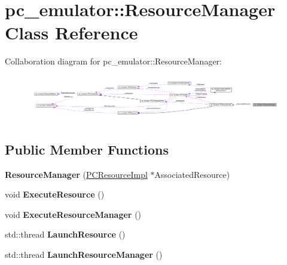 \hypertarget{classpc__emulator_1_1ResourceManager}{}\section{pc\+\_\+emulator\+:\+:Resource\+Manager Class Reference}
\label{classpc__emulator_1_1ResourceManager}


Collaboration diagram for pc\+\_\+emulator\+:\+:Resource\+Manager\+:
\nopagebreak
\begin{figure}[H]
\begin{center}
\leavevmode
\includegraphics[width=350pt]{classpc__emulator_1_1ResourceManager__coll__graph}
\end{center}
\end{figure}
\subsection*{Public Member Functions}
\begin{DoxyCompactItemize}
\item 
{\bfseries Resource\+Manager} (\hyperlink{classpc__emulator_1_1PCResourceImpl}{P\+C\+Resource\+Impl} $\ast$Associated\+Resource)\hypertarget{classpc__emulator_1_1ResourceManager_a342411d8f20e1a25699b9b3ada2968dc}{}\label{classpc__emulator_1_1ResourceManager_a342411d8f20e1a25699b9b3ada2968dc}

\item 
void {\bfseries Execute\+Resource} ()\hypertarget{classpc__emulator_1_1ResourceManager_a8f3e065bf68a40e88b8e1dc71e70480d}{}\label{classpc__emulator_1_1ResourceManager_a8f3e065bf68a40e88b8e1dc71e70480d}

\item 
void {\bfseries Execute\+Resource\+Manager} ()\hypertarget{classpc__emulator_1_1ResourceManager_ad1ca07861c6f5a276c76a11fc5255c21}{}\label{classpc__emulator_1_1ResourceManager_ad1ca07861c6f5a276c76a11fc5255c21}

\item 
std\+::thread {\bfseries Launch\+Resource} ()\hypertarget{classpc__emulator_1_1ResourceManager_aaee2535ac7c878169d7f32fa7fa344fe}{}\label{classpc__emulator_1_1ResourceManager_aaee2535ac7c878169d7f32fa7fa344fe}

\item 
std\+::thread {\bfseries Launch\+Resource\+Manager} ()\hypertarget{classpc__emulator_1_1ResourceManager_aae39d5ff38fbc3475f816826952c81c8}{}\label{classpc__emulator_1_1ResourceManager_aae39d5ff38fbc3475f816826952c81c8}

\end{DoxyCompactItemize}
